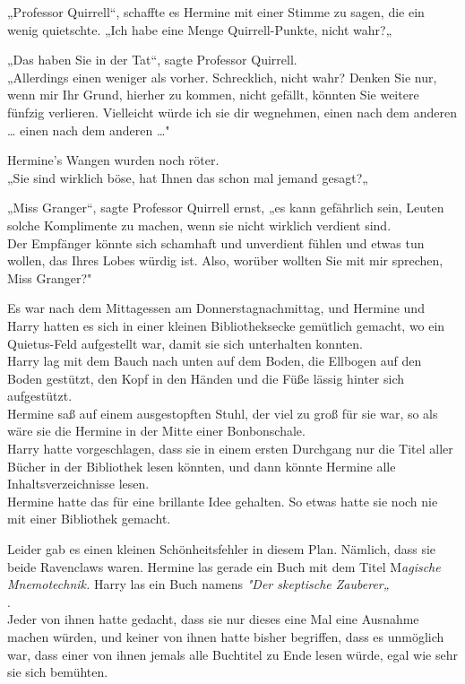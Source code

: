 {„Professor Quirrell“, schaffte es Hermine mit einer Stimme zu sagen, die ein wenig quietschte. „Ich habe eine Menge Quirrell-Punkte, nicht wahr?„

„Das haben Sie in der Tat“, sagte Professor Quirrell.\\ „Allerdings einen weniger als vorher. Schrecklich, nicht wahr? Denken Sie nur, wenn mir Ihr Grund, hierher zu kommen, nicht gefällt, könnten Sie weitere fünfzig verlieren. Vielleicht würde ich sie dir wegnehmen, einen nach dem anderen … einen nach dem anderen …"

Hermine's Wangen wurden noch röter.\\ „Sie sind wirklich böse, hat Ihnen das schon mal jemand gesagt?„

„Miss Granger“, sagte Professor Quirrell ernst, „es kann gefährlich sein, Leuten solche Komplimente zu machen, wenn sie nicht wirklich verdient sind.\\ Der Empfänger könnte sich schamhaft und unverdient fühlen und etwas tun wollen, das Ihres Lobes würdig ist. Also, worüber wollten Sie mit mir sprechen, Miss Granger?"

Es war nach dem Mittagessen am Donnerstagnachmittag, und Hermine und Harry hatten es sich in einer kleinen Bibliotheksecke gemütlich gemacht, wo ein Quietus-Feld aufgestellt war, damit sie sich unterhalten konnten.\\ Harry lag mit dem Bauch nach unten auf dem Boden, die Ellbogen auf den Boden gestützt, den Kopf in den Händen und die Füße lässig hinter sich aufgestützt.\\ Hermine saß auf einem ausgestopften Stuhl, der viel zu groß für sie war, so als wäre sie die Hermine in der Mitte einer Bonbonschale.\\ Harry hatte vorgeschlagen, dass sie in einem ersten Durchgang nur die Titel aller Bücher in der Bibliothek lesen könnten, und dann könnte Hermine alle Inhaltsverzeichnisse lesen.\\ Hermine hatte das für eine brillante Idee gehalten. So etwas hatte sie noch nie mit einer Bibliothek gemacht.

Leider gab es einen kleinen Schönheitsfehler in diesem Plan. Nämlich, dass sie beide Ravenclaws waren. Hermine las gerade ein Buch mit dem Titel M\emph{agische Mnemotechnik.} Harry las ein Buch namens \emph{"Der skeptische Zauberer„}\\ .\\ Jeder von ihnen hatte gedacht, dass sie nur dieses eine Mal eine Ausnahme machen würden, und keiner von ihnen hatte bisher begriffen, dass es unmöglich war, dass einer von ihnen jemals alle Buchtitel zu Ende lesen würde, egal wie sehr sie sich bemühten.

}
